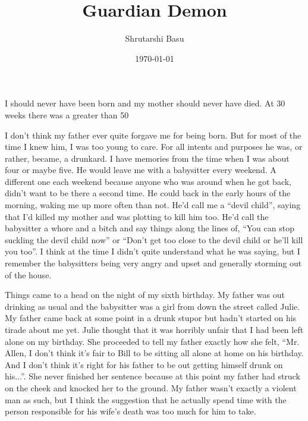 \documentclass[11pt,letterpaper]{article}
\title{Guardian Demon}
\author{Shrutarshi Basu}
\date{\today}
\begin{document}
\maketitle
\doublespacing

I should never have been born and my mother should never have died. At 30 weeks there was a greater than 50%

I don't think my father ever quite forgave me for being born. But for most of the time I knew him, I was too young to care. For all intents and purposes he was, or rather, became, a drunkard. I have memories from the time when I was about four or maybe five. He would leave me with a babysitter every weekend. A different one each weekend because anyone who was around when he got back, didn't want to be there a second time. He could back in the early hours of the morning, waking me up more often than not. He'd call me a ``devil child'', saying that I'd killed my mother and was plotting to kill him too. He'd call the babysitter a whore and a bitch and say things along the lines of, ``You can stop suckling the devil child now'' or ``Don't get too close to the devil child or he'll kill you too''. I think at the time I didn't quite understand what he was saying, but I remember the babysitters being very angry and upset and generally storming out of the house.

Things came to a head on the night of my sixth birthday. My father was out drinking as usual and the babysitter was a girl from down the street called Julie. My father came back at some point in a drunk stupor but hadn't started on his tirade about me yet. Julie thought that it was horribly unfair that I had been left alone on my birthday. She proceeded to tell my father exactly how she felt, ``Mr. Allen, I don't think it's fair to Bill to be sitting all alone at home on his birthday. And I don't think it's right for his father to be out getting himself drunk on his...''. She never finished her sentence because at this point my father had struck on the cheek and knocked her to the ground. My father wasn't exactly a violent man as such, but I think the suggestion that he actually spend time with the person responsible for his wife's death was too much for him to take.
\end{document}
